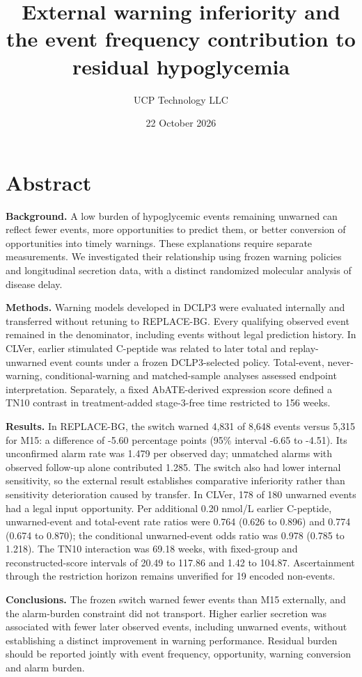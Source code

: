 \documentclass[
  american,
  11pt,
  letterpaper,
]{article}
\title{External warning inferiority and the event frequency contribution
to residual hypoglycemia}
\author{UCP Technology LLC}
\date{22 October 2026}
\begin{document}
\maketitle

\section{Abstract}\label{abstract}

\textbf{Background.} A low burden of hypoglycemic events remaining
unwarned can reflect fewer events, more opportunities to predict them,
or better conversion of opportunities into timely warnings. These
explanations require separate measurements. We investigated their
relationship using frozen warning policies and longitudinal secretion
data, with a distinct randomized molecular analysis of disease delay.

\textbf{Methods.} Warning models developed in DCLP3 were evaluated
internally and transferred without retuning to REPLACE-BG. Every
qualifying observed event remained in the denominator, including events
without legal prediction history. In CLVer, earlier stimulated C-peptide
was related to later total and replay-unwarned event counts under a
frozen DCLP3-selected policy. Total-event, never-warning,
conditional-warning and matched-sample analyses assessed endpoint
interpretation. Separately, a fixed AbATE-derived expression score
defined a TN10 contrast in treatment-added stage-3-free time restricted
to 156 weeks.

\textbf{Results.} In REPLACE-BG, the switch warned 4,831 of 8,648 events
versus 5,315 for M15: a difference of \mbox{-5.60} percentage points (95\%
interval \mbox{-6.65} to \mbox{-4.51}). Its unconfirmed alarm rate was 1.479 per
observed day; unmatched alarms with observed follow-up alone contributed
1.285. The switch also had lower internal sensitivity, so the external
result establishes comparative inferiority rather than sensitivity
deterioration caused by transfer. In CLVer, 178 of 180 unwarned events
had a legal input opportunity. Per additional 0.20 nmol/L earlier
C-peptide, unwarned-event and total-event rate ratios were 0.764 (0.626
to 0.896) and 0.774 (0.674 to 0.870); the conditional unwarned-event
odds ratio was 0.978 (0.785 to 1.218). The TN10 interaction was 69.18
weeks, with fixed-group and reconstructed-score intervals of 20.49 to
117.86 and 1.42 to 104.87. Ascertainment through the restriction horizon
remains unverified for 19 encoded non-events.

\textbf{Conclusions.} The frozen switch warned fewer events than M15
externally, and the alarm-burden constraint did not transport. Higher
earlier secretion was associated with fewer later observed events,
including unwarned events, without establishing a distinct improvement
in warning performance. Residual burden should be reported jointly with
event frequency, opportunity, warning conversion and alarm burden.
\end{document}

